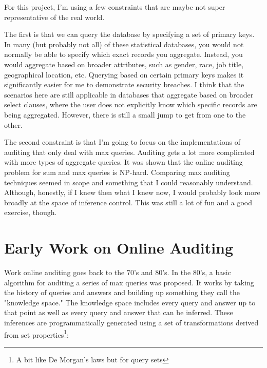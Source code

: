 \documentclass{article}
\begin{document}
For this project, I'm using a few constraints that are maybe not super representative of the real world.

The first is that we can query the database by specifying a set of primary keys.
In many (but probably not all) of these statistical databases, you would not normally be able to specify which exact records you aggregate. 
Instead, you would aggregate based on broader attributes, such as gender, race, job title, geographical location, etc.
Querying based on certain primary keys makes it significantly easier for me to demonstrate security breaches.
I think that the scenarios here are still applicable in databases that aggregate based on broader select clauses, where the user does not explicitly know which specific records are being aggregated.
However, there is still a small jump to get from one to the other.

The second constraint is that I'm going to focus on the implementations of auditing that only deal with max queries.
Auditing gets a lot more complicated with more types of aggregate queries.
It was shown that the online auditing problem for sum and max queries is NP-hard\cite{Chin:1986}.
Comparing max auditing techniques seemed in scope and something that I could reasonably understand.
Although, honestly, if I knew then what I knew now, I would probably look more broadly at the space of inference control.
This was still a lot of fun and a good exercise, though.

\section{Early Work on Online Auditing}

Work online auditing goes back to the 70's and 80's.
In the 80's, a basic algorithm for auditing a series of max queries was proposed\cite{Chin:1986}.
It works by taking the history of queries and answers and building up something they call the "knowledge space."
The knowledge space includes every query and answer up to that point as well as every query and answer that can be inferred.
These inferences are programmatically generated using a set of transformations derived from set properties\footnote{A bit like De Morgan's laws but for query sets}:
\end{document}

